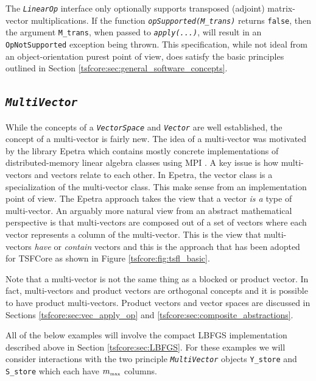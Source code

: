 The {}\texttt{\textit{LinearOp}} interface only optionally supports
transposed (adjoint) matrix-vector multiplications.  If the function
{}\texttt{\textit{opSupported(M\_trans)}} returns {}\texttt{false},
then the argument {}\texttt{M\_trans}, when passed to
{}\texttt{\textit{apply(\-...)}}, will result in an
{}\texttt{OpNotSupported} exception being thrown.  This specification,
while not ideal from an object-orientation purest point of view, does
satisfy the basic principles outlined in Section
{}\ref{tsfcore:sec:general_software_concepts}.

%
\subsection{\texttt{\textit{Multi\-Vector}}}
\label{tsfcore:sec:multi_vec}
%

While the concepts of a {}\texttt{\textit{VectorSpace}} and
{}\texttt{\textit{Vector}} are well established, the concept of a
multi-vector is fairly new.  The idea of a multi-vector was motivated
by the library Epetra {}\cite{ref:Epetra} which contains mostly
concrete implementations of distributed-memory linear algebra classes
using MPI {}\cite{ref:mpi}.  A key issue is how multi-vectors and
vectors relate to each other.  In Epetra, the vector class is a
specialization of the multi-vector class.  This make sense from an
implementation point of view.  The Epetra approach takes the view that
a vector {\em is a} type of multi-vector.  An arguably more natural
view from an abstract mathematical perspective is that multi-vectors
are composed out of a set of vectors where each vector represents a
column of the multi-vector.  This is the view that multi-vectors {\em
have} or {\em contain} vectors and this is the approach that has been
adopted for TSFCore as shown in Figure {}\ref{tsfcore:fig:tsfl_basic}.

Note that a multi-vector is not the same thing as a blocked or product
vector.  In fact, multi-vectors and product vectors are orthogonal
concepts and it is possible to have product multi-vectors.  Product
vectors and vector spaces are discussed in Sections
{}\ref{tsfcore:sec:vec_apply_op} and
{}\ref{tsfcore:sec:composite_abstractions}.

All of the below examples will involve the compact LBFGS
implementation described above in Section {}\ref{tsfcore:sec:LBFGS}.
For these examples we will consider interactions with the two
principle {}\texttt{\textit{Multi\-Vector}} objects
{}\texttt{Y\_store} and {}\texttt{S\_store} which each have
$m_{\tiny\mbox{max}}$ columns.

